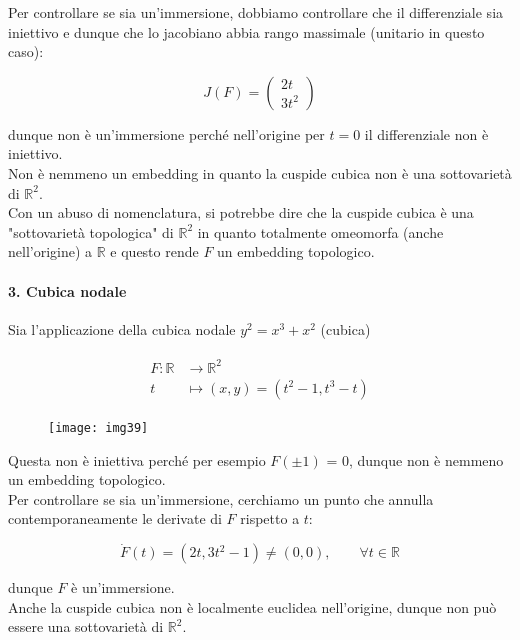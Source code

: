 Per controllare se sia un'immersione, dobbiamo controllare che il differenziale sia iniettivo e dunque che lo jacobiano abbia rango massimale (unitario in questo caso):

\begin{equation}
	J(F) = \begin{pmatrix} 2t \\ 3t^{2} \end{pmatrix}
\end{equation}

dunque non è un'immersione perché nell'origine per $ t=0 $ il differenziale non è iniettivo.\\
Non è nemmeno un embedding in quanto la cuspide cubica non è una sottovarietà di $ \mathbb{R}^{2} $.\\
Con un abuso di nomenclatura, si potrebbe dire che la cuspide cubica è una "sottovarietà topologica" di $ \mathbb{R}^{2} $ in quanto totalmente omeomorfa (anche nell'origine) a $ \mathbb{R} $ e questo rende $ F $ un embedding topologico.

\paragraph{3. Cubica nodale}

Sia l'applicazione della cubica nodale $ y^{2} = x^{3} + x^{2} $ (cubica)

\begin{align}
	\begin{split}
		F : \mathbb{R} &\to \mathbb{R}^{2}\\
		t &\mapsto (x,y) = (t^{2}-1,t^{3}-t)
	\end{split}
\end{align}

\begin{figure}[H]
	\centering
	\texttt{[image: img39]}
\end{figure}

Questa non è iniettiva perché per esempio $ F(\pm 1) $ = 0, dunque non è nemmeno un embedding topologico.\\
Per controllare se sia un'immersione, cerchiamo un punto che annulla contemporaneamente le derivate di $ F $ rispetto a $ t $:

\begin{equation}
	\dot{F}(t) = (2t, 3 t^{2} - 1) \neq (0,0), \qquad \forall t \in \mathbb{R}
\end{equation}

dunque $ F $ è un'immersione.\\
Anche la cuspide cubica non è localmente euclidea nell'origine, dunque non può essere una sottovarietà di $ \mathbb{R}^{2} $.

